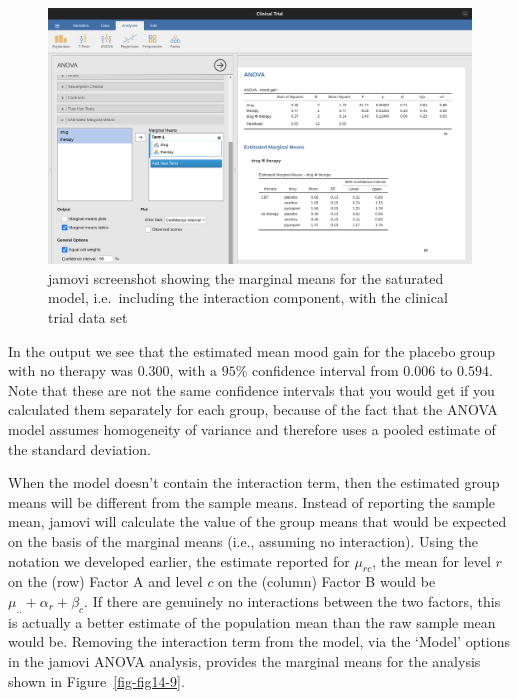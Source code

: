 \documentclass[
  a4paper,
]{book}
\begin{document}
\begin{figure}

\includegraphics[width=1\textwidth,height=\textheight]{images/fig14-8.png} \hfill{}

\caption{\label{fig-fig14-8}jamovi screenshot showing the marginal means
for the saturated model, i.e.~including the interaction component, with
the clinical trial data set}

\end{figure}

In the output we see that the estimated mean mood gain for the placebo
group with no therapy was \(0.300\), with a \(95\%\) confidence interval
from \(0.006\) to \(0.594\). Note that these are not the same confidence
intervals that you would get if you calculated them separately for each
group, because of the fact that the ANOVA model assumes homogeneity of
variance and therefore uses a pooled estimate of the standard deviation.

When the model doesn't contain the interaction term, then the estimated
group means will be different from the sample means. Instead of
reporting the sample mean, jamovi will calculate the value of the group
means that would be expected on the basis of the marginal means (i.e.,
assuming no interaction). Using the notation we developed earlier, the
estimate reported for \(\mu_{rc}\), the mean for level \(r\) on the
(row) Factor A and level \(c\) on the (column) Factor B would be
\(\mu_{..} + \alpha_r + \beta_c\). If there are genuinely no
interactions between the two factors, this is actually a better estimate
of the population mean than the raw sample mean would be. Removing the
interaction term from the model, via the `Model' options in the jamovi
ANOVA analysis, provides the marginal means for the analysis shown in
Figure~\ref{fig-fig14-9}.
\end{document}
